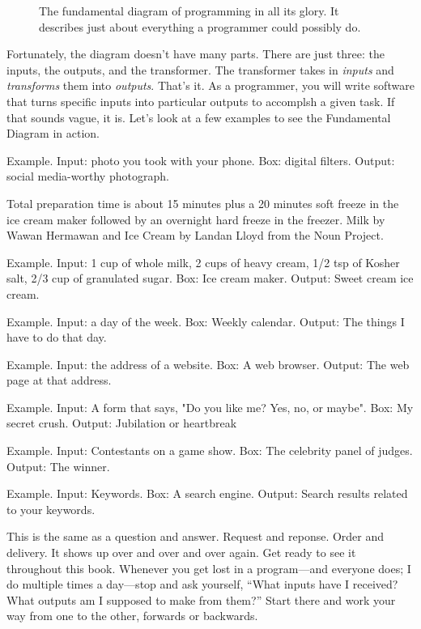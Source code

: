\begin{figure}[h]
  
  \caption{\label{fig:intro-fundemental-diagram} The fundamental diagram of programming in all its glory. It describes just about everything a programmer could possibly do.}
\end{figure}

Fortunately, the diagram doesn't have many parts. There are just three: the inputs, the outputs, and the transformer. The transformer takes in \emph{inputs} and \emph{transforms} them into \emph{outputs}. That's it. As a programmer, you will write software that turns specific inputs into particular outputs to accomplsh a given task. If that sounds vague, it is. Let's look at a few examples to see the Fundamental Diagram in action.

Example. Input: photo you took with your phone. Box: digital filters. Output: social media-worthy photograph.

\begin{marginfigure}
  
  \caption{\label{fig:intro-example-ice-cream} Total preparation time is about 15 minutes plus a 20 minutes soft freeze in the ice cream maker followed by an overnight hard freeze in the freezer.\vskip 5pt Milk by Wawan Hermawan and Ice Cream by Landan Lloyd from the Noun Project.}
\end{marginfigure}


Example. Input: 1 cup of whole milk, 2 cups of heavy cream, 1/2 tsp of Kosher salt, 2/3 cup of granulated sugar. Box: Ice cream maker. Output: Sweet cream ice cream.

Example. Input: a day of the week. Box: Weekly calendar. Output: The things I have to do that day.

Example. Input: the address of a website. Box: A web browser. Output: The web page at that address.

Example. Input: A form that says, "Do you like me? Yes, no, or maybe". Box: My secret crush. Output: Jubilation or heartbreak

Example. Input: Contestants on a game show. Box: The celebrity panel of judges. Output: The winner.

Example. Input: Keywords. Box: A search engine. Output: Search results related to your keywords.

This is the same as a question and answer. Request and reponse. Order and delivery. It shows up over and over and over again. Get ready to see it throughout this book. Whenever you get lost in a program---and everyone does; I do multiple times a day---stop and ask yourself, ``What inputs have I received? What outputs am I supposed to make from them?'' Start there and work your way from one to the other, forwards or backwards.


